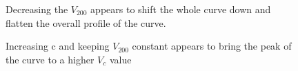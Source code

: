 \documentclass[twocolumn,11pt]{article}
\begin{document}
\begin{figure}[!h]
	\centering
	\noindent
      \caption{Decreasing the $V_{200}$ appears to shift the whole curve down and flatten the overall profile of the curve.}
\end{figure}
\begin{figure}[!h]
	\centering
	\noindent
      \caption{Increasing c and keeping $V_{200}$ constant appears to bring the peak of the curve to a higher $V_c$ value}
\end{figure}
\end{document}
